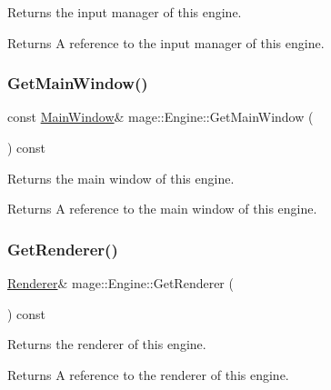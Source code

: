 Returns the input manager of this engine.

\begin{DoxyReturn}{Returns}
A reference to the input manager of this engine. 
\end{DoxyReturn}
\hypertarget{classmage_1_1_engine_a3bfc843926e0870cd5b8d512fb392607}{}\label{classmage_1_1_engine_a3bfc843926e0870cd5b8d512fb392607} 
\subsubsection{\texorpdfstring{Get\+Main\+Window()}{GetMainWindow()}}
{\footnotesize\ttfamily const \hyperlink{classmage_1_1_main_window}{Main\+Window}\& mage\+::\+Engine\+::\+Get\+Main\+Window (\begin{DoxyParamCaption}{ }\end{DoxyParamCaption}) const}

Returns the main window of this engine.

\begin{DoxyReturn}{Returns}
A reference to the main window of this engine. 
\end{DoxyReturn}
\hypertarget{classmage_1_1_engine_a42a90a61ede031ee768b8aa6d7f808ae}{}\label{classmage_1_1_engine_a42a90a61ede031ee768b8aa6d7f808ae} 
\subsubsection{\texorpdfstring{Get\+Renderer()}{GetRenderer()}}
{\footnotesize\ttfamily \hyperlink{classmage_1_1_renderer}{Renderer}\& mage\+::\+Engine\+::\+Get\+Renderer (\begin{DoxyParamCaption}{ }\end{DoxyParamCaption}) const}

Returns the renderer of this engine.

\begin{DoxyReturn}{Returns}
A reference to the renderer of this engine. 
\end{DoxyReturn}
\hypertarget{classmage_1_1_engine_a1a18dc9775f6ab4c9cd103b07ad47903}{}\label{classmage_1_1_engine_a1a18dc9775f6ab4c9cd103b07ad47903} 
